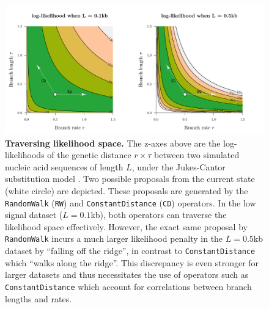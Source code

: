 \documentclass[10pt,letterpaper]{article}
\begin{document}
\begin{figure}[!h]
\includegraphics[width=\textwidth]{Figures/correlations.pdf}
\caption{\textbf{Traversing likelihood space.}
The z-axes above are the log-likelihoods of the genetic distance $r \times \tau$ between two simulated nucleic acid sequences of length $L$, under the Jukes-Cantor substitution model \cite{jukes1969evolution}. 
Two possible proposals from the current state (white circle) are depicted.
These proposals are generated by the \texttt{RandomWalk} (\texttt{RW}) and \texttt{ConstantDistance} (\texttt{CD}) operators.
In the low signal dataset ($L=0.1$kb), both operators can traverse the likelihood space effectively.
 However, the exact same proposal by \texttt{RandomWalk} incurs a much larger likelihood penalty in the $L=0.5$kb dataset by ``falling off the ridge'', in contrast to \texttt{ConstantDistance} which ``walks along the ridge''.
 This discrepancy is even stronger for larger datasets and thus necessitates the use of operators such as \texttt{ConstantDistance} which account for correlations between branch lengths and rates. }
\label{fig:rateparams}
\end{figure}
\end{document}
